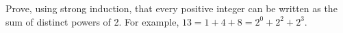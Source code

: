 \begin{questions}
%
%
%



%



\question Prove, using strong induction, that every positive integer can be written as the sum of distinct powers of 2.  For example, $13 = 1 + 4 + 8 = 2^0 + 2^2 + 2^3$.


\end{questions}

